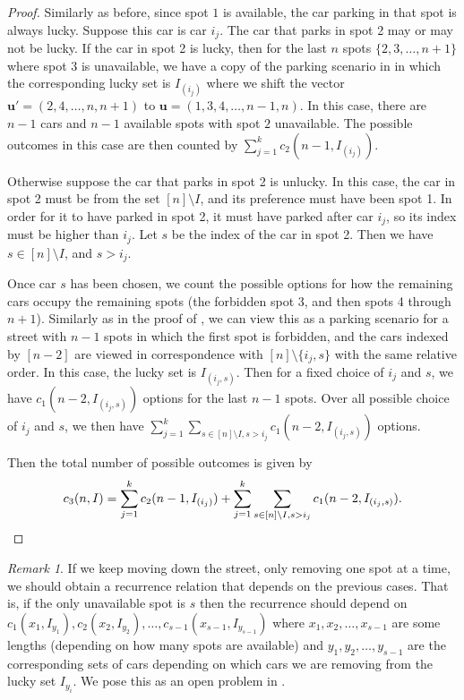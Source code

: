 \documentclass[reqno]{amsart}
\theoremstyle{definition}
\theoremstyle{remark}
\newtheorem*{remark}{Remark}
\newcommand{\bsy}{\boldsymbol}
\begin{document}
\begin{proof}
Similarly as before, since spot $1$ is available, the car parking in that spot is always lucky. Suppose this car is car $i_j$. The car that parks in spot 2 may or may not be lucky. If the car in spot 2 is lucky, then for the last $n$ spots $\{2,3,\ldots, n+1\}$ where spot $3$ is unavailable, we have a copy of the parking scenario in  in which the corresponding lucky set is $I_{(i_j)}$ where we shift the vector $\bsy{u'}=(2,4,\ldots,n,n+1)$ to $\bsy{u}=(1,3,4,\ldots,n-1,n)$. In this case, there are $n-1$ cars and $n-1$ available spots with spot $2$ unavailable. The possible outcomes in this case are then counted by $\sum_{j = 1}^k c_2(n-1, I_{(i_j)})$.

Otherwise suppose the car that parks in spot 2 is unlucky. In this case, the car in spot 2 must be from the set $[n]\setminus I$, and its preference must have been spot 1. In order for it to have parked in spot 2, it must have parked after car $i_j$, so its index must be higher than $i_j$. Let $s$ be the index of the car in spot 2. Then we have $s\in [n]\setminus I$, and $s>i_j$.

Once car $s$ has been chosen, we count the possible options for how the remaining cars occupy the remaining spots (the forbidden spot 3, and then spots 4 through $n+1$). Similarly as in the proof of , we can view this as a parking scenario for a street with $n-1$ spots in which the first spot is forbidden, and the cars indexed by $[n-2]$ are viewed in correspondence with $[n] \setminus \{i_j, s\}$ with the same relative order. In this case, the lucky set is $I_{(i_j,s)}$. Then for a fixed choice of $i_j$ and $s$, we have $c_1(n-2,I_{(i_j,s)})$ options for the last $n-1$ spots. Over all possible choice of $i_j$ and $s$, we then have $\sum_{j=1}^k \sum_{s \in [n] \setminus I, s>i_j}c_1(n-2,I_{(i_j,s)})$ options.

Then the total number of possible outcomes is given by
\[ c_3(n,I)=\sum_{j = 1}^k c_2(n-1, I_{(i_j)}) + \sum_{j = 1}^k \sum_{s \in [n] \backslash I, s > i_j} c_1(n-2, I_{(i_j,s)}). \qedhere\]
\end{proof}


\begin{remark}
If we keep moving down the street, only removing one spot at a time, we should obtain a recurrence relation that depends on the previous cases. That is, if the only unavailable spot is $s$ then the recurrence should depend on $c_1(x_1,I_{y_1}), c_2(x_2,I_{y_2}), \ldots, c_{s-1}(x_{s-1},I_{y_{s-1}})$ where $x_1, x_2,\ldots,x_{s-1}$ are some lengths (depending on how many spots are available) and $y_1,y_2,\ldots,y_{s-1}$ are the corresponding sets of cars depending on which cars we are removing from the lucky set $I_{y_i}$. We pose this as an open problem in .
\end{remark}
\end{document}
